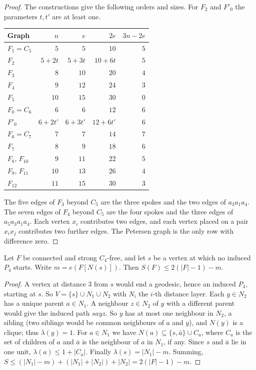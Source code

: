 \documentclass[ASNA]{USG}
\theoremstyle{WBstyletwo}
\numberwithin{equation}{section}
\begin{document}
\begin{proof}
The constructions give the following orders and sizes. For $F_2$ and $F'_0$ the parameters $t,t'$ are at least one.
\begin{center}
\begin{tabular}{@{}lrrrr@{}}
\toprule
Graph & $n$ & $e$ & $2e$ & $3n-2e$\\
\midrule
$F_1=C_5$ & $5$ & $5$ & $10$ & $5$\\
$F_2$ & $5+2t$ & $5+3t$ & $10+6t$ & $5$\\
$F_3$ & $8$ & $10$ & $20$ & $4$\\
$F_4$ & $9$ & $12$ & $24$ & $3$\\
$F_5$ & $10$ & $15$ & $30$ & $0$\\
$F_0=C_6$ & $6$ & $6$ & $12$ & $6$\\
$F'_0$ & $6+2t'$ & $6+3t'$ & $12+6t'$ & $6$\\
$F_6=C_7$ & $7$ & $7$ & $14$ & $7$\\
$F_7$ & $8$ & $9$ & $18$ & $6$\\
$F_8$, $F_{10}$ & $9$ & $11$ & $22$ & $5$\\
$F_9$, $F_{11}$ & $10$ & $13$ & $26$ & $4$\\
$F_{12}$ & $11$ & $15$ & $30$ & $3$\\
\bottomrule
\end{tabular}
\end{center}
The five edges of $F_3$ beyond $C_5$ are the three spokes and the two edges of $a_3a_1a_4$. The seven edges of $F_4$ beyond $C_5$ are the four spokes and the three edges of $a_5a_3a_1a_4$. Each vertex $x_i$ contributes two edges, and each vertex placed on a pair $x_ix_j$ contributes two further edges. The Petersen graph is the only row with difference zero.
\end{proof}

\begin{lemma}\label{lem:rootedp4}
Let $F$ be connected and strong $C_4$-free, and let $s$ be a vertex at which no induced $P_4$ starts. Write $m=e(F[N(s)])$. Then $S(F)\le 2(|F|-1)-m$.
\end{lemma}

\begin{proof}
A vertex at distance $3$ from $s$ would end a geodesic, hence an induced $P_4$, starting at $s$. So $V=\{s\}\cup N_1\cup N_2$ with $N_i$ the $i$-th distance layer. Each $y\in N_2$ has a unique parent $a\in N_1$. A neighbour $z\in N_2$ of $y$ with a different parent would give the induced path $sayz$. So $y$ has at most one neighbour in $N_2$, a sibling (two siblings would be common neighbours of $a$ and $y$), and $N(y)$ is a clique; thus $\lambda(y)=1$. For $a\in N_1$ we have $N(a)\subseteq\{s,\bar a\}\cup C_a$, where $C_a$ is the set of children of $a$ and $\bar a$ is the neighbour of $a$ in $N_1$, if any. Since $s$ and $\bar a$ lie in one unit, $\lambda(a)\le 1+|C_a|$. Finally $\lambda(s)=|N_1|-m$. Summing, $S\le(|N_1|-m)+(|N_1|+|N_2|)+|N_2|=2(|F|-1)-m$.
\end{proof}
\end{document}
